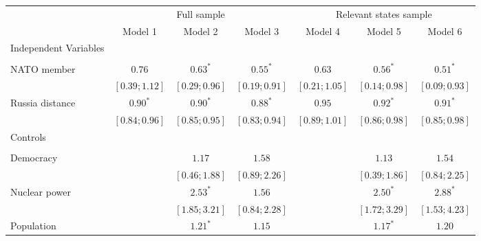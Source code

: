 
\begin{table}[h!]
\begin{center}
\begin{tabular}{l c c c c c c}
\hline
 & \multicolumn{3}{c}{Full sample} & \multicolumn{3}{c}{Relevant states sample} \\
\cline{2-4} \cline{5-7}
 & Model 1 & Model 2 & Model 3 & Model 4 & Model 5 & Model 6 \\
\hline
Independent Variables &                 &                 &                 &                 &                 &                 \\
                      &                 &                 &                 &                 &                 &                 \\
\quad NATO member     & $0.76$          & $0.63^{*}$      & $0.55^{*}$      & $0.63$          & $0.56^{*}$      & $0.51^{*}$      \\
                      & $ [0.39; 1.12]$ & $ [0.29; 0.96]$ & $ [0.19; 0.91]$ & $ [0.21; 1.05]$ & $ [0.14; 0.98]$ & $ [0.09; 0.93]$ \\
\quad Russia distance & $0.90^{*}$      & $0.90^{*}$      & $0.88^{*}$      & $0.95$          & $0.92^{*}$      & $0.91^{*}$      \\
                      & $ [0.84; 0.96]$ & $ [0.85; 0.95]$ & $ [0.83; 0.94]$ & $ [0.89; 1.01]$ & $ [0.86; 0.98]$ & $ [0.85; 0.98]$ \\
Controls              &                 &                 &                 &                 &                 &                 \\
                      &                 &                 &                 &                 &                 &                 \\
\quad Democracy       &                 & $1.17$          & $1.58$          &                 & $1.13$          & $1.54$          \\
                      &                 & $ [0.46; 1.88]$ & $ [0.89; 2.26]$ &                 & $ [0.39; 1.86]$ & $ [0.84; 2.25]$ \\
\quad Nuclear power   &                 & $2.53^{*}$      & $1.56$          &                 & $2.50^{*}$      & $2.88^{*}$      \\
                      &                 & $ [1.85; 3.21]$ & $ [0.84; 2.28]$ &                 & $ [1.72; 3.29]$ & $ [1.53; 4.23]$ \\
\quad Population      &                 & $1.21^{*}$      & $1.15$          &                 & $1.17^{*}$      & $1.20$          \\

\end{tabular}
\end{center}
\end{table}
